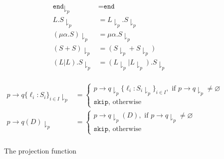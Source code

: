 \begin{figure}[ht]

  $$\begin{array}{rlr}
      \texttt{end}\downharpoonright_p  & = \texttt{end}                                                     \\
      L.S\downharpoonright_p           & = L\downharpoonright_p.S\downharpoonright_p                        \\
      (\mu\alpha.S)\downharpoonright_p & = \mu\alpha.S\downharpoonright_p                                   \\
      (S+S)\downharpoonright_p         & = (S\downharpoonright_p+S\downharpoonright_p)                      \\
      (L|L).S\downharpoonright_p       & = (L\downharpoonright_p|L\downharpoonright_p).S\downharpoonright_p \\
    \end{array}$$

  $$\begin{array}{rlr}
      p\rightarrow q \{\ell_i: S_i\}_{i\in I}\downharpoonright_p & =
      \begin{cases}
        p\rightarrow q\downharpoonright_p \{\ell_i: S_i\downharpoonright_p\}_{i\in I}, \text{ if } p\rightarrow q\downharpoonright_p\ne\varnothing \\
        \texttt{skip}, \text{ otherwise}
      \end{cases} \\

      p\rightarrow q (D)\downharpoonright_p                      & =
      \begin{cases}
        p\rightarrow q\downharpoonright_p (D), \text{ if } p\rightarrow q\downharpoonright_p\ne\varnothing \\
        \texttt{skip}, \text{ otherwise}
      \end{cases}                                         \\
    \end{array}$$

  \caption{The projection function}
\end{figure}


